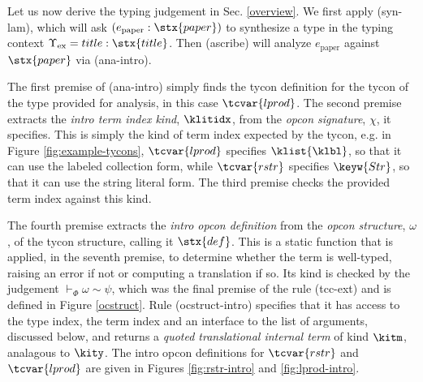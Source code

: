 Let us now derive the typing judgement in Sec. \ref{overview}. We first apply (syn-lam), which will ask $(e_\text{paper} : \stx{paper})$ to synthesize a type in the typing context $\Upsilon_\text{ex}=title : \stx{title}$. Then (ascribe) will analyze $e_\text{paper}$ against $\stx{paper}$ via (ana-intro). 

The first premise of (ana-intro) simply finds the tycon definition for the tycon of the type provided for analysis, in this case $\tcvar{lprod}$. %
The second premise extracts the \emph{intro term index kind}, $\klitidx$, from the \emph{opcon signature}, $\chi$, it specifies. This is simply the kind of term index expected by the tycon, e.g. in Figure \ref{fig:example-tycons}, $\tcvar{lprod}$ specifies $\klist{\klbl}$, so that it can use the labeled collection form, while $\tcvar{rstr}$ specifies  $\keyw{Str}$, so that it can use the string literal form. The third premise checks the provided term index against this kind.  %


The fourth premise extracts the \emph{intro opcon definition} from the \emph{opcon structure}, $\omega$, of the tycon structure, calling it $\stx{def}$. This is a static function that is applied, in the seventh premise, to determine whether the term is well-typed, raising an error if not or computing a translation if so. Its kind is checked by the  judgement $\vdash_\Phi \omega \sim \psi$, which was the final premise of the rule (tcc-ext) and is defined in Figure \ref{ocstruct}. Rule (ocstruct-intro) specifies that it has access to the type index, the term index and an interface to the list of arguments, discussed below, and returns a \emph{quoted translational internal term} of kind $\kitm$, analagous to $\kity$. The intro opcon definitions for $\tcvar{rstr}$ and $\tcvar{lprod}$ are given in Figures \ref{fig:rstr-intro} and \ref{fig:lprod-intro}.

